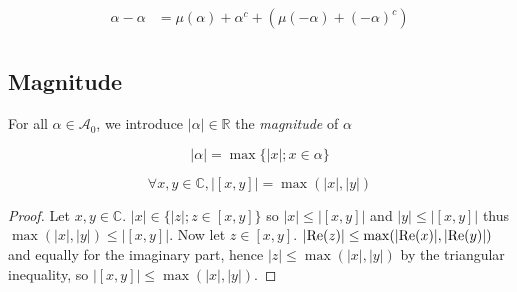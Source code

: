 \begin{align*}
\alpha - \alpha
&= \mu(\alpha) + \alpha^c + (\mu(-\alpha) + (-\alpha)^c)\\
\end{align*}

\subsection{Magnitude}

For all $\alpha \in \mathcal{A}_0$, we introduce $|\alpha| \in \mathbb{R}$ the \textit{magnitude} of $\alpha$

$$|\alpha| = \max \{|x| ; x \in \alpha\}$$

\begin{prop}
    $$\forall x, y \in \mathbb C, \left|[x, y]\right| = \max (|x|, |y|)$$
\end{prop}
\begin{proof}
    Let $x, y \in \mathbb C$. $|x| \in \{|z| ; z \in [x, y]\}$ so $|x| \le \left|[x, y]\right|$ and $|y| \le \left|[x, y]\right|$ thus $\max (|x|, |y|) \le \left|[x, y]\right|$.
    Now let $z \in [x, y]$. $|\mathrm{Re}(z)| \le \max (|\mathrm{Re}(x)|, |\mathrm{Re}(y)|)$ and equally for the imaginary part, hence $|z| \le \max (|x|, |y|)$ by the triangular inequality, so $|[x, y]| \le \max (|x|, |y|)$.
\end{proof}
